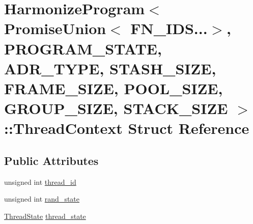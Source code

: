 \hypertarget{structHarmonizeProgram_3_01PromiseUnion_3_01FN__IDS_8_8_8_4_00	PROGRAM__STATE_00	ADR__TYPE_00	ST8d3ed3d8234af105b6f030f997d25f62}{\section{Harmonize\-Program$<$ Promise\-Union$<$ F\-N\-\_\-\-I\-D\-S...$>$, P\-R\-O\-G\-R\-A\-M\-\_\-\-S\-T\-A\-T\-E, A\-D\-R\-\_\-\-T\-Y\-P\-E, S\-T\-A\-S\-H\-\_\-\-S\-I\-Z\-E, F\-R\-A\-M\-E\-\_\-\-S\-I\-Z\-E, P\-O\-O\-L\-\_\-\-S\-I\-Z\-E, G\-R\-O\-U\-P\-\_\-\-S\-I\-Z\-E, S\-T\-A\-C\-K\-\_\-\-S\-I\-Z\-E $>$\-:\-:Thread\-Context Struct Reference}
\label{structHarmonizeProgram_3_01PromiseUnion_3_01FN__IDS_8_8_8_4_00	PROGRAM__STATE_00	ADR__TYPE_00	ST8d3ed3d8234af105b6f030f997d25f62}
}
\subsection*{Public Attributes}
\begin{DoxyCompactItemize}
\item 
unsigned int \hyperlink{structHarmonizeProgram_3_01PromiseUnion_3_01FN__IDS_8_8_8_4_00	PROGRAM__STATE_00	ADR__TYPE_00	ST8d3ed3d8234af105b6f030f997d25f62_a3d1e409c109252f898a88762fcccfc59}{thread\-\_\-id}
\item 
unsigned int \hyperlink{structHarmonizeProgram_3_01PromiseUnion_3_01FN__IDS_8_8_8_4_00	PROGRAM__STATE_00	ADR__TYPE_00	ST8d3ed3d8234af105b6f030f997d25f62_a8b8e1f70597f19644313b6f9f2e79e5a}{rand\-\_\-state}
\item 
\hyperlink{structHarmonizeProgram_3_01PromiseUnion_3_01FN__IDS_8_8_8_4_00	PROGRAM__STATE_00	ADR__TYPE_00	ST96305cc1a177b714bc64a5044f46c97c_a16e744d042f3be72dc5da471ce8cafc6}{Thread\-State} \hyperlink{structHarmonizeProgram_3_01PromiseUnion_3_01FN__IDS_8_8_8_4_00	PROGRAM__STATE_00	ADR__TYPE_00	ST8d3ed3d8234af105b6f030f997d25f62_a769d15ceb4e676667448593fa346f774}{thread\-\_\-state}
\end{DoxyCompactItemize}


